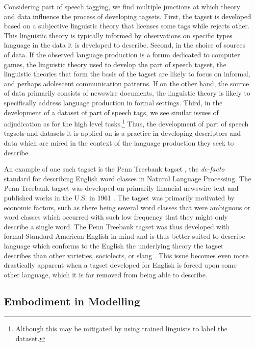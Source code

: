 Considering part of speech tagging, we find multiple junctions at which theory and data influence the process of developing tagsets. First, the tagset is developed based on a subjective linguistic theory that licenses some tags while rejects other. This linguistic theory is typically informed by observations on specific types language in the data it is developed to describe. Second, in the choice of sources of data. If the observed language production is a forum dedicated to computer games, the linguistic theory used to develop the part of speech tagset, the linguistic theories that form the basis of the tagset are likely to focus on informal, and perhaps adolescent communication patterns. If on the other hand, the source of data primarily consists of newswire documents, the linguistic theory is likely to specifically address language production in formal settings. Third, in the development of a dataset of part of speech tags, we see similar issues of adjudication as for the high level tasks.\footnote{Although this may be mitigated by using trained linguists to label the dataset.}
Thus, the development of part of speech tagsets and datasets it is applied on is a practice in developing descriptors and data which are mired in the context of the language production they seek to describe.

An example of one such tagset is the Penn Treebank tagset \cite{Marcus:1993}, the \textit{de-facto} standard for describing English word classes in Natural Language Processing. The Penn Treebank tagset was developed on primarily financial newswire text and published works in the U.S. in 1961 \cite{Francis:1982}. The tagset was primarily motivated by economic factors, such as there being several word classes that were ambiguous or word classes which occurred with such low frequency that they might only describe a single word. The Penn Treebank tagset was thus developed with formal Standard American English in mind and is thus better suited to describe language which conforms to the English the underlying theory the tagset describes than other varieties, sociolects, or slang \cite{Jorgensen:2016}.
This issue becomes even more drastically apparent when a tagset developed for English is forced upon some other language, which it is far removed from being able to describe.

\subsection{Embodiment in Modelling}

